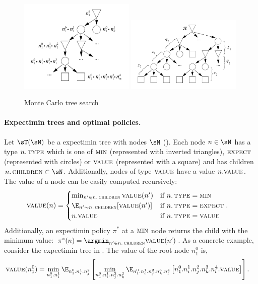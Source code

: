 \begin{figure}
 \includegraphics[width=0.49\textwidth,height=0.23\textheight,keepaspectratio]{figures/game-tree.pdf}
  \hfill
 \includegraphics[width=0.49\textwidth,height=0.23\textheight,keepaspectratio]{figures/lookahead-one.pdf}
  \caption{Monte Carlo tree search}
\label{fig:mcts}
\end{figure}

\paragraph{Expectimin trees and optimal policies.}
Let $\sT(\sN)$ be a expectimin tree with nodes $\sN$ ().
Each node $n \in \sN$ has a type $n.\operatorname{\textsc{type}}$ which is one of $\textsc{min}$ (represented with inverted triangles), $\textsc{expect}$ (represented with circles) or $\textsc{value}$ (represented with a square) and has children $n.\scchildren \subset \sN$.
Additionally, nodes of type $\textsc{value}$ have a value $n.\textsc{value}$.
The value of a node can be easily computed recursively: 
\begin{align*}
  \scvalue(n) &=
  \begin{cases}
    \min_{n'\in n.\scchildren} \scvalue(n') & \textrm{if}~n.\sctype = \scmin \\
    \E_{n'\sim n.\scchildren}[\scvalue(n')] & \textrm{if}~n.\sctype = \scexpect \\
    n.\scvalue & \textrm{if}~n.\sctype = \scvalue
  \end{cases}.
\end{align*}
Additionally, an expectimin policy $\pi^*$ at a $\textsc{min}$ node returns the child with the minimum value: $\pi^*(n) = \argmin_{n' \in n.\scchildren} \scvalue(n')$.
As a concrete example, consider the expectimin tree in . The value of the root node $n_1^0$ is,
\begin{align*}
  \scvalue(n_1^0) &= \min_{n_1^0.n_i^1} \E_{n_1^0.n_i^1.n_j^2} \left[\min_{n_1^0.n_i^1.n_j^2.n_k^3} \E_{n_1^0.n_i^1.n_j^2.n_k^3.n_l^4} \left[n_1^0.n_i^1.n_j^2.n_k^3.n_l^4.\scvalue \right] \right].
\end{align*}

